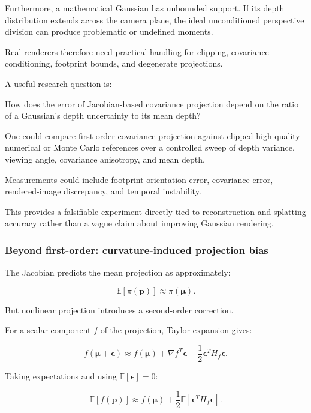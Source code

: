 Furthermore, a mathematical Gaussian has unbounded support. If its depth distribution extends across the camera plane, the ideal unconditioned perspective division can produce problematic or undefined moments.

Real renderers therefore need practical handling for clipping, covariance conditioning, footprint bounds, and degenerate projections.

A useful research question is:

How does the error of Jacobian-based covariance projection depend on the ratio of a Gaussian's depth uncertainty to its mean depth?

One could compare first-order covariance projection against clipped high-quality numerical or Monte Carlo references over a controlled sweep of depth variance, viewing angle, covariance anisotropy, and mean depth.

Measurements could include footprint orientation error, covariance error, rendered-image discrepancy, and temporal instability.

This provides a falsifiable experiment directly tied to reconstruction and splatting accuracy rather than a vague claim about improving Gaussian rendering.

\subsubsection{Beyond first-order: curvature-induced projection bias}\label{02-foundations-ii-ch021-beyond-first-order-curvature-induced-projection-bias}

\hypertarget{02-foundations-ii-ch021-beyond-first-order-curvature-induced-projection-bias}{}

The Jacobian predicts the mean projection as approximately:

\[
\mathbb E[\pi(\mathbf p)] \approx\pi(\boldsymbol\mu).
\]

But nonlinear projection introduces a second-order correction.

For a scalar component \(f\) of the projection, Taylor expansion gives:

\[
f(\boldsymbol\mu+\boldsymbol\epsilon) \approx f(\boldsymbol\mu) + \nabla f^T\boldsymbol\epsilon + \frac12\boldsymbol\epsilon^TH_f\boldsymbol\epsilon.
\]

Taking expectations and using \(\mathbb E[\boldsymbol\epsilon]=0\):

\[
\mathbb E[f(\mathbf p)] \approx f(\boldsymbol\mu) + \frac12\mathbb E[ \boldsymbol\epsilon^TH_f\boldsymbol\epsilon ].
\]

